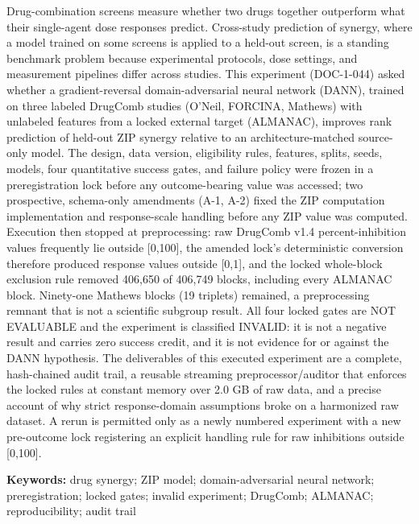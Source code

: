 \documentclass[11pt,letterpaper]{article}
\newcommand{\psec}[2]{\par\vspace{14pt}{\color{navy}\large\bfseries #1\quad #2}\par\vspace{6pt}}
\begin{document}
\psec{}{Abstract}
Drug-combination screens measure whether two drugs together outperform what their single-agent dose responses predict. Cross-study prediction of synergy, where a model trained on some screens is applied to a held-out screen, is a standing benchmark problem because experimental protocols, dose settings, and measurement pipelines differ across studies. This experiment (DOC-1-044) asked whether a gradient-reversal domain-adversarial neural network (DANN), trained on three labeled DrugComb studies (O'Neil, FORCINA, Mathews) with unlabeled features from a locked external target (ALMANAC), improves rank prediction of held-out ZIP synergy relative to an architecture-matched source-only model. The design, data version, eligibility rules, features, splits, seeds, models, four quantitative success gates, and failure policy were frozen in a preregistration lock before any outcome-bearing value was accessed; two prospective, schema-only amendments (A-1, A-2) fixed the ZIP computation implementation and response-scale handling before any ZIP value was computed. Execution then stopped at preprocessing: raw DrugComb v1.4 percent-inhibition values frequently lie outside [0,100], the amended lock's deterministic conversion therefore produced response values outside [0,1], and the locked whole-block exclusion rule removed 406,650 of 406,749 blocks, including every ALMANAC block. Ninety-one Mathews blocks (19 triplets) remained, a preprocessing remnant that is not a scientific subgroup result. All four locked gates are NOT EVALUABLE and the experiment is classified INVALID: it is not a negative result and carries zero success credit, and it is not evidence for or against the DANN hypothesis. The deliverables of this executed experiment are a complete, hash-chained audit trail, a reusable streaming preprocessor/auditor that enforces the locked rules at constant memory over 2.0 GB of raw data, and a precise account of why strict response-domain assumptions broke on a harmonized raw dataset. A rerun is permitted only as a newly numbered experiment with a new pre-outcome lock registering an explicit handling rule for raw inhibitions outside [0,100].

\vspace{6pt}
{\color{navy}\bfseries Keywords:} drug synergy; ZIP model; domain-adversarial neural network; preregistration; locked gates; invalid experiment; DrugComb; ALMANAC; reproducibility; audit trail
\clearpage

\psec{1.}{Introduction and hypothesis}
\end{document}
